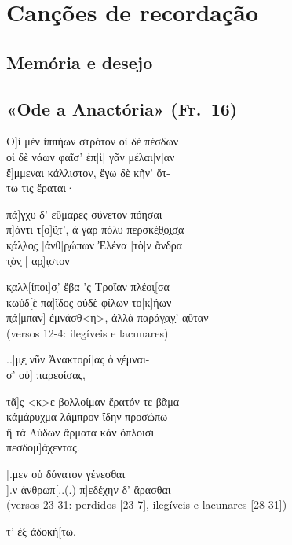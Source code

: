 {\chapter{Canções de recordação}

\section{Memória e desejo}

\section{«Ode a Anactória» (Fr.~16)}

\begin{gkverse}
Ο]ἰ μὲν ἰππήων στρότον οἰ δὲ πέσδων\\
οἰ δὲ νάων φαῖσ’ ἐπ[ὶ] γᾶν μέλαι[ν]αν\\
ἔ]μμεναι κάλλιστον, ἔγω δὲ κῆν’ ὄτ-\\
τω τις ἔραται·

πά]γχυ δ’ εὔμαρες σύνετον πόησαι\\
π]άντι τ[ο]ῦ̣τ’, ἀ γὰρ πόλυ περσκέ̣θ̣ο̣ι̣σ̣α\\
κ̣άλ̣λο̣ς̣ [ἀνθ]ρ̣ώπων Ἐλένα [τὸ]ν ἄνδρα\\
τ̣ὸν̣ [    αρ̣]ι̣στον

κ̣αλλ[ίποι]σ̣’ ἔβα ’ς Τροΐαν πλέοι̣[σα\\
κωὐδ[ὲ πα]ῖδος οὐδὲ φίλων το[κ]ήων\\
π̣ά[μπαν] ἐμνάσθ<η>, ἀλλὰ παράγ̣α̣γ̣’ α̣ὔταν\\

(versos 12-4: ilegíveis e lacunares)

..]μ̣ε̣ νῦν Ἀνακτορί[ας ὀ]ν̣έ̣μναι-\\
σ’ οὐ] παρεοίσας,

τᾶ]ς <κ>ε βολλοίμαν ἔρατόν τε βᾶμα\\
κἀμάρυχμα λάμπρον ἴδην προσώπω\\
ἢ τὰ Λύδων ἄρματα κἀν ὄπλοισι\\
πεσδομ]άχεντας.

			   ].μεν οὑ δύνατον γένεσθαι\\
		   ].ν ἀνθρωπ[..(.) π]εδέχην δ’ ἅρασθαι\\

	(versos 23-31: perdidos [23-7], ilegíveis e lacunares [28-31])

     τ’ ἐξ ἀδοκή[τω.
\end{gkverse}

\chapter*{}
}
